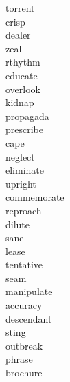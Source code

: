 \documentclass[a4paper, 10pt]{ctexart}
\begin{document}
\begin{multicols*}{2}
\begin{description}
\item[torrent]

\item[crisp]

\item[dealer]

\item[zeal]

\item[rthythm]

\item[educate]

\item[overlook]

\item[kidnap]

\item[propagada]

\item[prescribe]

\item[cape]

\item[neglect]

\item[eliminate]

\item[upright]

\item[commemorate]

\item[reproach]

\item[dilute]

\item[sane]

\item[lease]

\item[tentative]

\item[seam]

\item[manipulate]

\item[accuracy]

\item[descendant]

\item[sting]

\item[outbreak]

\item[phrase]

\item[brochure]


\end{description}
\end{multicols*}
\end{document}
